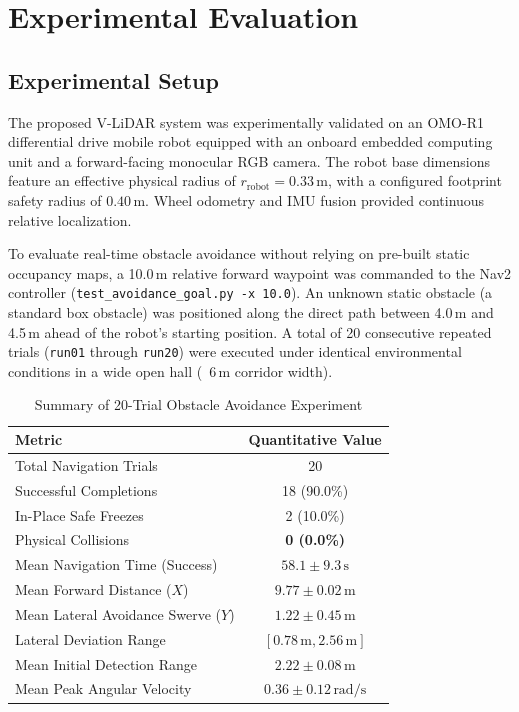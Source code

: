 \section{Experimental Evaluation}

\subsection{Experimental Setup}
The proposed V-LiDAR system was experimentally validated on an OMO-R1 differential drive mobile robot equipped with an onboard embedded computing unit and a forward-facing monocular RGB camera. The robot base dimensions feature an effective physical radius of $r_{\text{robot}} = 0.33\,\text{m}$, with a configured footprint safety radius of $0.40\,\text{m}$. Wheel odometry and IMU fusion provided continuous relative localization.

To evaluate real-time obstacle avoidance without relying on pre-built static occupancy maps, a 10.0\,m relative forward waypoint was commanded to the Nav2 controller (\texttt{test\_avoidance\_goal.py -x 10.0}). An unknown static obstacle (a standard box obstacle) was positioned along the direct path between 4.0\,m and 4.5\,m ahead of the robot's starting position. A total of 20 consecutive repeated trials (\texttt{run01} through \texttt{run20}) were executed under identical environmental conditions in a wide open hall (~6\,m corridor width).

\begin{table}[t]
\centering
\caption{Summary of 20-Trial Obstacle Avoidance Experiment}
\label{tab:exp_summary}
\begin{tabular}{lc}
\toprule
\textbf{Metric} & \textbf{Quantitative Value} \\
\midrule
Total Navigation Trials & 20 \\
Successful Completions & 18 (90.0\%) \\
In-Place Safe Freezes & 2 (10.0\%) \\
Physical Collisions & \textbf{0 (0.0\%)} \\
Mean Navigation Time (Success) & $58.1 \pm 9.3\,\text{s}$ \\
Mean Forward Distance ($X$) & $9.77 \pm 0.02\,\text{m}$ \\
Mean Lateral Avoidance Swerve ($Y$) & $1.22 \pm 0.45\,\text{m}$ \\
Lateral Deviation Range & $[0.78\,\text{m}, 2.56\,\text{m}]$ \\
Mean Initial Detection Range & $2.22 \pm 0.08\,\text{m}$ \\
Mean Peak Angular Velocity & $0.36 \pm 0.12\,\text{rad/s}$ \\
\bottomrule
\end{tabular}
\end{table}

